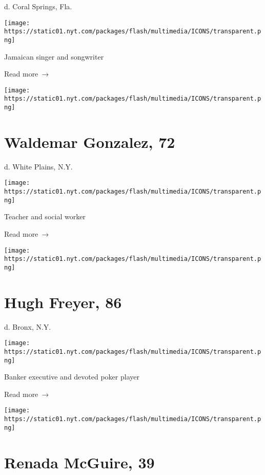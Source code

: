 d. Coral Springs, Fla.

\texttt{[image: https://static01.nyt.com/packages/flash/multimedia/ICONS/transparent.png]}

Jamaican singer and songwriter

 Read more~→

\href{https://www.nytimes.com/2020/07/30/obituaries/waldemar-gonzalez-dead-coronavirus.html}{}

\texttt{[image: https://static01.nyt.com/packages/flash/multimedia/ICONS/transparent.png]}

\hypertarget{waldemar-gonzalez-72}{%
\section{Waldemar Gonzalez, 72}\label{waldemar-gonzalez-72}}

d. White Plains, N.Y.

\texttt{[image: https://static01.nyt.com/packages/flash/multimedia/ICONS/transparent.png]}

Teacher and social worker

 Read more~→

\href{https://www.nytimes.com/2020/07/30/obituaries/hugh-freyer-dead-coronavirus.html}{}

\texttt{[image: https://static01.nyt.com/packages/flash/multimedia/ICONS/transparent.png]}

\hypertarget{hugh-freyer-86}{%
\section{Hugh Freyer, 86}\label{hugh-freyer-86}}

d. Bronx, N.Y.

\texttt{[image: https://static01.nyt.com/packages/flash/multimedia/ICONS/transparent.png]}

Banker executive and devoted poker player

 Read more~→

\href{https://www.nytimes.com/2020/07/29/obituaries/renada-mcguire-dead-coronavirus.html}{}

\texttt{[image: https://static01.nyt.com/packages/flash/multimedia/ICONS/transparent.png]}

\hypertarget{renada-mcguire-39}{%
\section{Renada McGuire, 39}\label{renada-mcguire-39}}

